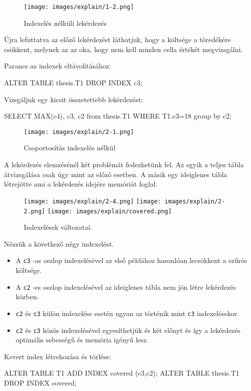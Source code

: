 \begin{figure}[h!]
\centering
\texttt{[image: images/explain/1-2.png]}
\caption{Indexelés nélküli lekérdezés}
\label{fig:schema}
\end{figure}

Újra lefuttatva az előző lekérdezést láthatjuk, hogy a költsége a töredékére csökkent, melynek az az oka, hogy nem kell minden cella értékét megvizsgálni.

Parancs az indexek eltávolításához:
\begin{python} 
ALTER TABLE  thesis.T1  DROP INDEX c3;
\end{python}

\newpage
{}

Vizsgáljuk egy kicsit összetettebb lekérdezést: 
\begin{python} 
SELECT MAX(c4), c3, c2 from thesis.T1 WHERE T1.c3=18  group by c2;
\end{python}

\begin{figure}[h!]
\centering
\texttt{[image: images/explain/2-1.png]}
\caption{Csoportosítás indexelés nélkül}
\label{fig:schema}
\end{figure}

A lekérdezés elemzésénél két problémát fedezhetünk fel. Az egyik a teljes tábla átvizsgálása csak úgy mint az előző esetben. A másik egy ideiglenes tábla létrejötte ami a lekérdezés idejére memóriát foglal.

\begin{figure}[h!]
\centering
\texttt{[image: images/explain/2-4.png]}
\hspace{1cm} 
\texttt{[image: images/explain/2-2.png]}
\hspace{1cm} 
\texttt{[image: images/explain/covered.png]}
\caption{Indexelések változatai.}
\label{fig:schema}
\end{figure}

Nézzük a következő négy indexelést.
\begin{itemize} 
\item A \texttt{c3} -as oszlop indexelésével az első példához hasonlóan lecsökkent a szűrés költsége.
\item A \texttt{c2} -es oszlop indexelésével az ideiglenes tábla nem jön létre lekérdezés közben.
\item \texttt{c2} és \texttt{c3} külön indexelése esetén ugyan az történik mint \texttt{c3} indexelésekor.
\item \texttt{c2} és \texttt{c3} közös indexelésével egyesíthetjük és két előnyt és így a lekérdezés optimális sebességű és memória igényű lesz.
\end{itemize} 
Kevert index létrehozása és törlése:
\begin{python}
ALTER TABLE T1 ADD INDEX covered (c3,c2);
ALTER TABLE thesis.T1 DROP INDEX covered;
\end{python}

